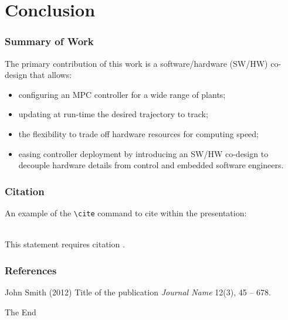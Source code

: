 \documentclass{beamer}
\begin{document}





\section{Conclusion}
\begin{frame}
\frametitle{Summary of Work}
The primary contribution of this work is a software/hardware (SW/HW) co-design that allows:
\begin{itemize}
\item configuring an MPC controller for a wide range of plants;
\item updating at run-time the desired trajectory to track;
\item the flexibility to trade off hardware resources for computing speed;
\item easing controller deployment by introducing an SW/HW co-design to decouple hardware details from control and embedded software engineers.
\end{itemize}

\end{frame}













\begin{frame}[fragile] %
\frametitle{Citation}
An example of the \verb|\cite| command to cite within the presentation:\\~

This statement requires citation \cite{p1}.
\end{frame}


\begin{frame}
\frametitle{References}
\footnotesize{
\begin{thebibliography}{99} %
 John Smith (2012)
\newblock Title of the publication
\newblock \emph{Journal Name} 12(3), 45 -- 678.
\end{thebibliography}
}
\end{frame}


\begin{frame}
\Huge{\centerline{The End}}
\end{frame}

\end{document}
